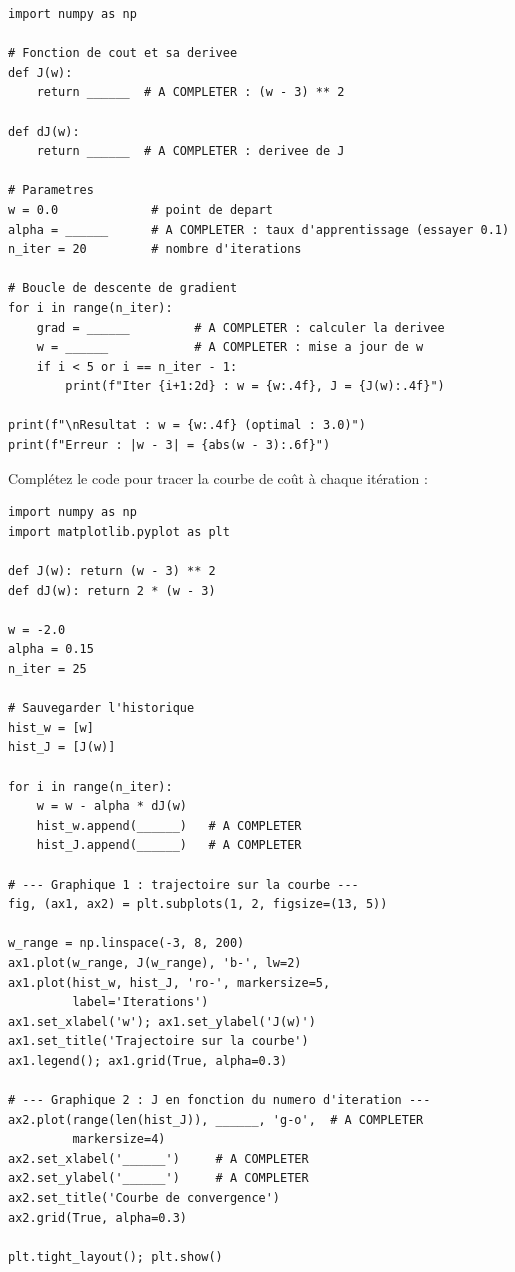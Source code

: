 \begin{pythonbox}
\begin{lstlisting}
import numpy as np

# Fonction de cout et sa derivee
def J(w):
    return ______  # A COMPLETER : (w - 3) ** 2

def dJ(w):
    return ______  # A COMPLETER : derivee de J

# Parametres
w = 0.0             # point de depart
alpha = ______      # A COMPLETER : taux d'apprentissage (essayer 0.1)
n_iter = 20         # nombre d'iterations

# Boucle de descente de gradient
for i in range(n_iter):
    grad = ______         # A COMPLETER : calculer la derivee
    w = ______            # A COMPLETER : mise a jour de w
    if i < 5 or i == n_iter - 1:
        print(f"Iter {i+1:2d} : w = {w:.4f}, J = {J(w):.4f}")

print(f"\nResultat : w = {w:.4f} (optimal : 3.0)")
print(f"Erreur : |w - 3| = {abs(w - 3):.6f}")
\end{lstlisting}
\end{pythonbox}


Compl\'{e}tez le code pour tracer la courbe de co\^{u}t \`{a} chaque it\'{e}ration :

\begin{pythonbox}
\begin{lstlisting}
import numpy as np
import matplotlib.pyplot as plt

def J(w): return (w - 3) ** 2
def dJ(w): return 2 * (w - 3)

w = -2.0
alpha = 0.15
n_iter = 25

# Sauvegarder l'historique
hist_w = [w]
hist_J = [J(w)]

for i in range(n_iter):
    w = w - alpha * dJ(w)
    hist_w.append(______)   # A COMPLETER
    hist_J.append(______)   # A COMPLETER

# --- Graphique 1 : trajectoire sur la courbe ---
fig, (ax1, ax2) = plt.subplots(1, 2, figsize=(13, 5))

w_range = np.linspace(-3, 8, 200)
ax1.plot(w_range, J(w_range), 'b-', lw=2)
ax1.plot(hist_w, hist_J, 'ro-', markersize=5,
         label='Iterations')
ax1.set_xlabel('w'); ax1.set_ylabel('J(w)')
ax1.set_title('Trajectoire sur la courbe')
ax1.legend(); ax1.grid(True, alpha=0.3)

# --- Graphique 2 : J en fonction du numero d'iteration ---
ax2.plot(range(len(hist_J)), ______, 'g-o',  # A COMPLETER
         markersize=4)
ax2.set_xlabel('______')     # A COMPLETER
ax2.set_ylabel('______')     # A COMPLETER
ax2.set_title('Courbe de convergence')
ax2.grid(True, alpha=0.3)

plt.tight_layout(); plt.show()
\end{lstlisting}
\end{pythonbox}

